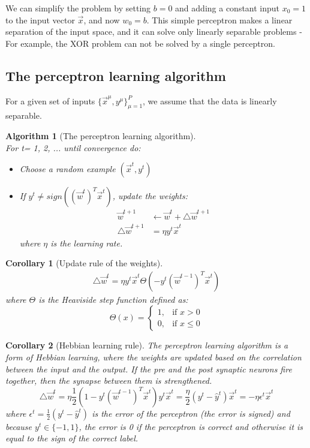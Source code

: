 \documentclass[11pt]{book} %
\newtheorem{corollary}{Corollary}[section]
\newtheorem{algorithm}{Algorithm}[section]
\begin{document}
We can simplify the problem by setting $b = 0$ and adding a constant input $x_0 = 1$ to the input vector $\vec{x}$, and now $w_0 = b$.
This simple perceptron makes a linear separation of the input space, and it can solve only linearly separable problems - 
For example, the XOR problem can not be solved by a single perceptron.


\subsection{The perceptron learning algorithm}
For a given set of inputs $\{\vec{x}^\mu, y^\mu\}_{\mu=1}^{P}$, we assume that the data is linearly separable.
\begin {algorithm}[The perceptron learning algorithm]\ \\
For t= 1, 2, ... until convergence do:
\begin{itemize}
    \item Choose a random example $(\vec{x}^t, y^t)$
    \item If $y^t \neq sign((\vec{w}^t)^T \vec{x}^t)$, update the weights:
    \begin{align*}
        \vec{w}^{t+1} &\leftarrow \vec{w}^t + \bigtriangleup \vec{w}^{t+1} \\
        \bigtriangleup \vec{w}^{t+1} &= \eta y^t \vec{x}^t
    \end{align*}
where $\eta$ is the learning rate.
\end{itemize}
\end{algorithm}


\begin{corollary}[Update rule of the weights]
    \begin{align}
        \bigtriangleup \vec{w}^t = \eta y^t \vec{x}^t \Theta (-y^t (\vec{w}^{t-1})^T \vec{x}^t)
    \end{align}
where $\Theta$ is the Heaviside step function defined as:
\[
    \Theta(x) = \begin{cases} 1, & \text{if } x > 0 \\ 0, & \text{if } x \leq 0 \end{cases}
\]
\end{corollary}

\begin{corollary}[Hebbian learning rule]
The perceptron learning algorithm is a form of Hebbian learning, where the weights are updated based on the correlation between the input and the output.
If the pre and the post synaptic neurons fire together, then the synapse between them is strengthened.
\[
    \bigtriangleup \vec{w}^t = \eta \frac{1}{2} (1 - y^t (\vec{w}^{t-1})^T \vec{x}^t) y^t \vec{x}^t = \frac{\eta}{2} (y^t -\hat{y}^t) \vec{x}^t = - \eta \epsilon^t \vec{x}^t
\]
where $\epsilon^t = \frac{1}{2} (y^t -\hat{y}^t)$ is the error of the perceptron (the error is signed) and because $y^t \in \{-1, 1\}$, the error is 0 if the perceptron is correct 
and otherwise it is equal to the sign of the correct label.
\end{corollary}
\end{document}
